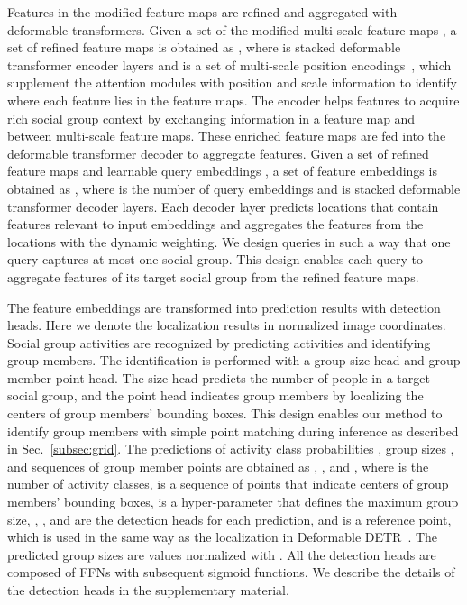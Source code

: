 \documentclass[runningheads]{llncs}
\begin{document}
Features in the modified feature maps are refined and aggregated with deformable transformers.
Given a set of the modified multi-scale feature maps , a set of refined feature maps  is obtained as , where  is stacked deformable transformer encoder layers and  is a set of multi-scale position encodings~\cite{zhu_iclr2021}, which supplement the attention modules with position and scale information to identify where each feature lies in the feature maps. The encoder helps features to acquire rich social group context by exchanging information in a feature map and between multi-scale feature maps.
These enriched feature maps are fed into the deformable transformer decoder to aggregate features. Given a set of refined feature maps  and learnable query embeddings , a set of feature embeddings  is obtained as , where  is the number of query embeddings and  is stacked deformable transformer decoder layers. Each decoder layer predicts locations that contain features relevant to input embeddings and aggregates the features from the locations with the dynamic weighting. We design queries in such a way that one query captures at most one social group. This design enables each query to aggregate features of its target social group from the refined feature maps.

The feature embeddings are transformed into prediction results with detection heads. Here we denote the localization results in normalized image coordinates.
Social group activities are recognized by predicting activities and identifying group members. The identification is performed with a group size head and group member point head. The size head predicts the number of people in a target social group, and the point head indicates group members by localizing the centers of group members' bounding boxes. This design enables our method to identify group members with simple point matching during inference as described in Sec.~\ref{subsec:grid}. The predictions of activity class probabilities , group sizes , and sequences of group member points  are obtained as , , and , where  is the number of activity classes,  is a sequence of points that indicate centers of group members' bounding boxes,  is a hyper-parameter that defines the maximum group size, , , and  are the detection heads for each prediction, and  is a reference point, which is used in the same way as the localization in Deformable DETR~\cite{zhu_iclr2021}. The predicted group sizes are values normalized with . All the detection heads are composed of FFNs with subsequent sigmoid functions. We describe the details of the detection heads in the supplementary material.
\end{document}
